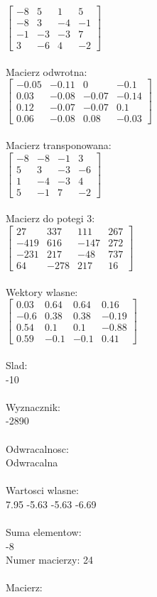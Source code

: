 \documentclass[a4paper,12pt]{article}
\begin{document}
$\begin{bmatrix} -8&5&1&5\\-8&3&-4&-1\\-1&-3&-3&7\\3&-6&4&-2 \end{bmatrix}$
\\
\\
Macierz odwrotna:\\

$\begin{bmatrix} -0.05&-0.11&0&-0.1\\0.03&-0.08&-0.07&-0.14\\0.12&-0.07&-0.07&0.1\\0.06&-0.08&0.08&-0.03 \end{bmatrix}$
\\
\\
Macierz transponowana:\\

$\begin{bmatrix} -8&-8&-1&3\\5&3&-3&-6\\1&-4&-3&4\\5&-1&7&-2 \end{bmatrix}$
\\
\\
Macierz do potegi 3:\\

$\begin{bmatrix} 27&337&111&267\\-419&616&-147&272\\-231&217&-48&737\\64&-278&217&16 \end{bmatrix}$
\\
\\
Wektory wlasne:\\

$\begin{bmatrix} 0.03&0.64&0.64&0.16\\-0.6&0.38&0.38&-0.19\\0.54&0.1&0.1&-0.88\\0.59&-0.1&-0.1&0.41 \end{bmatrix}$
\\
\\
Slad:\\
-10
\\
\\
Wyznacznik:\\
-2890
\\
\\
Odwracalnosc:\\
Odwracalna
\\
\\
Wartosci wlasne:\\
7.95 -5.63 -5.63 -6.69
\\
\\
Suma elementow:\\
-8
\\
\newpage
Numer macierzy:
24
\\
\\
Macierz:\\
\end{document}
